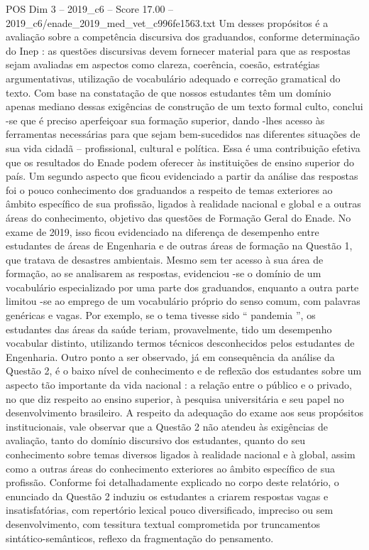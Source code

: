 \begin{textsample}{POS Dim 3 – 2019\_c6 – Score 17.00 – 2019\_c6/enade\_2019\_med\_vet\_c996fe1563.txt}
Um desses propósitos é a avaliação sobre a competência discursiva dos graduandos, conforme determinação do Inep : as questões discursivas devem fornecer material para que as respostas sejam avaliadas em aspectos como clareza, coerência, coesão, estratégias argumentativas, utilização de vocabulário adequado e correção gramatical do texto.
Com base na constatação de que nossos estudantes têm um domínio apenas mediano dessas exigências de construção de um texto formal culto, conclui -se que é preciso aperfeiçoar sua formação superior, dando -lhes acesso às ferramentas necessárias para que sejam bem-sucedidos nas diferentes situações de sua vida cidadã – profissional, cultural e política.
Essa é uma contribuição efetiva que os resultados do Enade podem oferecer às instituições de ensino superior do país.
Um segundo aspecto que ficou evidenciado a partir da análise das respostas foi o pouco conhecimento dos graduandos a respeito de temas exteriores ao âmbito específico de sua profissão, ligados à realidade nacional e global e a outras áreas do conhecimento, objetivo das questões de Formação Geral do Enade.
No exame de 2019, isso ficou evidenciado na diferença de desempenho entre estudantes de áreas de Engenharia e de outras áreas de formação na Questão 1, que tratava de desastres ambientais.
Mesmo sem ter acesso à sua área de formação, ao se analisarem as respostas, evidenciou -se o domínio de um vocabulário especializado por uma parte dos graduandos, enquanto a outra parte limitou -se ao emprego de um vocabulário próprio do senso comum, com palavras genéricas e vagas.
Por exemplo, se o tema tivesse sido “ pandemia ”, os estudantes das áreas da saúde teriam, provavelmente, tido um desempenho vocabular distinto, utilizando termos técnicos desconhecidos pelos estudantes de Engenharia.
Outro ponto a ser observado, já em consequência da análise da Questão 2, é o baixo nível de conhecimento e de reflexão dos estudantes sobre um aspecto tão importante da vida nacional : a relação entre o público e o privado, no que diz respeito ao ensino superior, à pesquisa universitária e seu papel no desenvolvimento brasileiro.
A respeito da adequação do exame aos seus propósitos institucionais, vale observar que a Questão 2 não atendeu às exigências de avaliação, tanto do domínio discursivo dos estudantes, quanto do seu conhecimento sobre temas diversos ligados à realidade nacional e à global, assim como a outras áreas do conhecimento exteriores ao âmbito específico de sua profissão.
Conforme foi detalhadamente explicado no corpo deste relatório, o enunciado da Questão 2 induziu os estudantes a criarem respostas vagas e insatisfatórias, com repertório lexical pouco diversificado, impreciso ou sem desenvolvimento, com tessitura textual comprometida por truncamentos sintático-semânticos, reflexo da fragmentação do pensamento.

\end{textsample}
